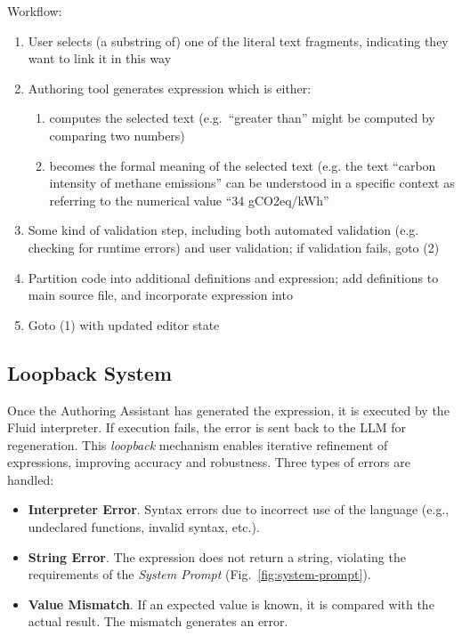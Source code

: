 Workflow:
\begin{enumerate}
\item User selects (a substring of) one of the literal text fragments, indicating they want to link it in this
way
\item Authoring tool generates expression which is either:
  \begin{enumerate}
  \item computes the selected text (e.g.~``greater than'' might be computed by comparing two numbers)
  \item becomes the formal meaning of the selected text (e.g. the text ``carbon intensity of methane
emissions'' can be understood in a specific context as referring to the numerical value ``34 gCO2eq/kWh''
  \end{enumerate}
\item Some kind of validation step, including both automated validation (e.g. checking for runtime errors) and
user validation; if validation fails, goto (2)
\item Partition code into additional definitions and expression; add definitions to main source file, and
incorporate expression into 
\item Goto (1) with updated editor state
\end{enumerate}

\subsection{Loopback System}
\label{subsec:loopback-system}

Once the Authoring Assistant has generated the expression, it is executed by the Fluid interpreter.
If execution fails, the error is sent back to the LLM for regeneration.
This \textit{loopback} mechanism enables iterative refinement of expressions, improving accuracy and robustness.
Three types of errors are handled:

\begin{itemize}
    \item \textbf{Interpreter Error}.
    Syntax errors due to incorrect use of the language (e.g., undeclared functions, invalid syntax, etc.).
    \item \textbf{String Error}.
    The expression does not return a string, violating the requirements of the \textit{System Prompt} (Fig.~\ref{fig:system-prompt}).
    \item \textbf{Value Mismatch}.
    If an expected value is known, it is compared with the actual result.
    The mismatch generates an error.
\end{itemize}


